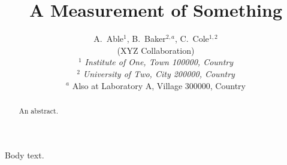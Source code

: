 \documentclass[aps,prd,twocolumn]{revtex4-1}
\begin{document}
\title{A Measurement of Something}
\author{
	A.~Able$^{1}$, B.~Baker$^{2,a}$, C.~Cole$^{1,2}$
	\\
	\vspace{0.2cm}
	(XYZ Collaboration)\\
	\vspace{0.2cm} {\it
		$^{1}$ Institute of One, Town 100000, Country\\
		$^{2}$ University of Two, City 200000, Country\\
}
		\vspace{0.2cm}
		$^{a}$ Also at Laboratory A, Village 300000, Country\\
}
\begin{abstract}
An abstract.
\end{abstract}
\maketitle
Body text.
\end{document}
